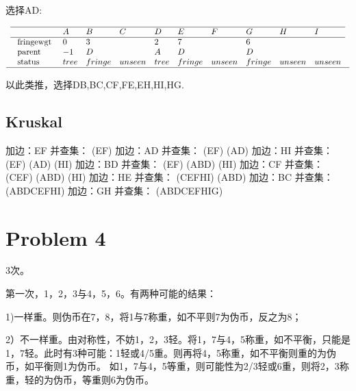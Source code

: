 \documentclass{article}
\begin{document}
选择AD:

\begin{equation}
    \nonumber
    \begin{array}{l}
        \begin{array}{lllllllllll}
        \hline & A & B & C & D & E & F & G & H & I \\
        \hline \text { fringewgt } & 0 & 3 &  & 2 & 7 &  & 6 &  &  \\
        \text { parent } & -1  & D &  & A & D &  & D &  & \\
        \text { status } & tree & fringe & unseen & tree & fringe & unseen  &  fringe  & unseen & unseen
        \end{array}\\
        \hline
    \end{array}
\end{equation}

以此类推，选择DB,BC,CF,FE,EH,HI,HG.

\subsection*{Kruskal}

加边：EF 并查集： (EF)
加边：AD 并查集： (EF) (AD)
加边：HI 并查集： (EF) (AD) (HI)
加边：BD 并查集： (EF) (ABD) (HI)
加边：CF 并查集： (CEF) (ABD) (HI)
加边：HE 并查集： (CEFHI) (ABD)
加边：BC 并查集： (ABDCEFHI)
加边：GH 并查集： (ABDCEFHIG)



\section*{Problem 4}
3次。

第一次，1，2，3与4，5，6。有两种可能的结果：

1)一样重。则伪币在7，8，将1与7称重，如不平则7为伪币，反之为8；

2）不一样重。由对称性，不妨1，2，3轻。将1，7与4，5称重，如不平衡，只能是1，7轻。此时有3种可能：1轻或4/5重。则再将4，5称重，如不平衡则重的为伪币，如平衡则1为伪币。
如1，7与4，5等重，则可能性为2/3轻或6重，则将2，3称重，轻的为伪币，等重则6为伪币。
\end{document}
